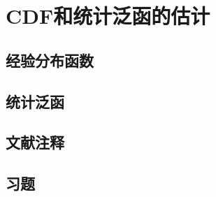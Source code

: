 \chapter{CDF和统计泛函的估计}

\section{经验分布函数}

\pending

\section{统计泛函}

\pending

\section{文献注释}

\pending

\section{习题}

\pending
